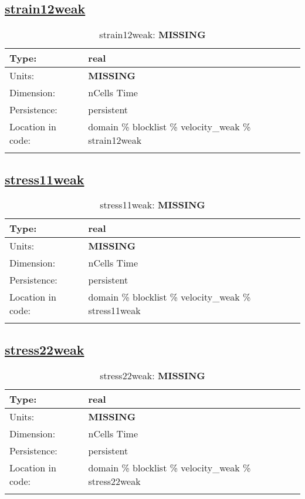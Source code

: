 \subsection[strain12weak]{\hyperref[sec:var_tab_velocity_weak]{strain12weak}}
\label{subsec:var_sec_velocity_weak_strain12weak}
\begin{center}
\begin{longtable}{| p{2.0in} | p{4.0in} |}
        \hline 
        Type: & real \\
        \hline 
        Units: & {\bf \color{red} MISSING} \\
        \hline 
        Dimension: & nCells Time \\
        \hline 
        Persistence: & persistent \\
        \hline 
         Location in code: & domain \% blocklist \% velocity\_weak \% strain12weak \\
         \hline 
    \caption{strain12weak: {\bf \color{red} MISSING}}
\end{longtable}
\end{center}
\subsection[stress11weak]{\hyperref[sec:var_tab_velocity_weak]{stress11weak}}
\label{subsec:var_sec_velocity_weak_stress11weak}
\begin{center}
\begin{longtable}{| p{2.0in} | p{4.0in} |}
        \hline 
        Type: & real \\
        \hline 
        Units: & {\bf \color{red} MISSING} \\
        \hline 
        Dimension: & nCells Time \\
        \hline 
        Persistence: & persistent \\
        \hline 
         Location in code: & domain \% blocklist \% velocity\_weak \% stress11weak \\
         \hline 
    \caption{stress11weak: {\bf \color{red} MISSING}}
\end{longtable}
\end{center}
\subsection[stress22weak]{\hyperref[sec:var_tab_velocity_weak]{stress22weak}}
\label{subsec:var_sec_velocity_weak_stress22weak}
\begin{center}
\begin{longtable}{| p{2.0in} | p{4.0in} |}
        \hline 
        Type: & real \\
        \hline 
        Units: & {\bf \color{red} MISSING} \\
        \hline 
        Dimension: & nCells Time \\
        \hline 
        Persistence: & persistent \\
        \hline 
         Location in code: & domain \% blocklist \% velocity\_weak \% stress22weak \\
         \hline 
    \caption{stress22weak: {\bf \color{red} MISSING}}
\end{longtable}
\end{center}

